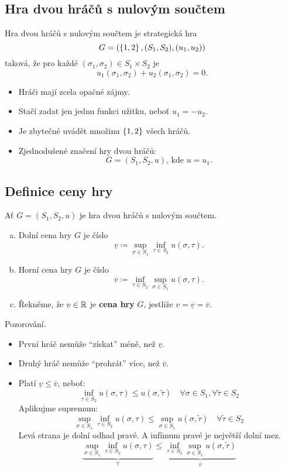 \subsection{Hra dvou hráčů s nulovým součtem}
Hra dvou hráčů s nulovým součtem je strategická hra
\[
    G = (\left\lbrace 1,2 \right\rbrace, (S_1, S_2), (u_1, u_2))
\]
taková, že pro každé $(\sigma_1, \sigma_2) \in S_1 \times S_2$ je
\[
    u_1(\sigma_1, \sigma_2) + u_2(\sigma_1, \sigma_2) = 0.
\]
\begin{itemize}
    \item Hráči mají zcela opačné zájmy.
    \item Stačí zadat jen jednu funkci užitku, neboť $u_1 = -u_2$.
    \item Je zbytečné uvádět množinu $\left\lbrace 1,2 \right\rbrace$ všech hráčů.
    \item Zjednodušené značení hry dvou hráčů:
    \[G = (S_1, S_2, u) \text{, kde } u = u_1.\]
\end{itemize}

\subsection{Definice ceny hry}\label{cenaHry}
Ať $G = (S_1, S_2, u)$ je hra dvou hráčů s nulovým součtem.
\begin{enumerate}[(a)]
    \item Dolní cena hry $G$ je číslo
    \[\underline{v} \coloneqq \sup_{\sigma \in S_1} \inf_{\tau \in S_2} u(\sigma, \tau).\]
    \item Horní cena hry $G$ je číslo
    \[\overline{v} \coloneqq \inf_{\tau \in S_2} \sup_{\sigma \in S_1} u(\sigma, \tau).\]
    \item Řekněme, že $v \in \mathbb{R}$ je \textbf{cena hry} $G$, jestliže $v = \underline{v} = \overline{v}$.
\end{enumerate}
Pozorování.
\begin{itemize}
    \item První hráč nemůže \enquote{získat} méně, než $\underline{v}$.
    \item Druhý hráč nemůže \enquote{prohrát} více, než $\overline{v}$.
    \item Platí $\underline{v} \leq \overline{v}$, neboť:
    \[
        \inf_{\tau \in S_2} u(\sigma, \tau) \leq u(\sigma, \tilde{\tau}) \quad \forall \sigma \in S_1, 
        \forall \tilde{\tau} \in S_2
    \]
    Aplikujme supremum:
    \[  
        \sup_{\sigma \in S_1} \inf_{\tau \in S_2} u(\sigma, \tau) \leq \sup_{\sigma \in S_1} u(\sigma, \tilde{\tau}) 
        \quad \forall \tilde{\tau} \in S_2
    \]
    Levá strana je dolní odhad pravé. A infímum pravé je největší dolní mez.
    \[
        \underbrace{\sup_{\sigma \in S_1} \inf_{\tau \in S_2} u(\sigma, \tau)}_{\underline{v}} \leq 
        \underbrace{\inf_{\tau \in S_2} \sup_{\sigma \in S_1} u(\sigma, \tilde{\tau})}_{\overline{v}}
    \]
\end{itemize}

